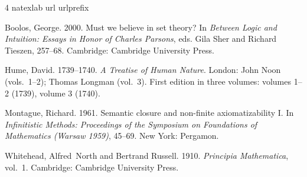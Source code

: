 \documentclass[openany]{memoir}
\begin{document}
\begin{otherlanguage}{english}
\renewcommand{\bibsection}{%
  \begin{otherlanguage}{persian}%
  \chapter*{کتاب‌نامه}%
  \addcontentsline{toc}{chapter}{کتاب‌نامه}%
  \markboth{کتاب‌نامه}{کتاب‌نامه}%
  \end{otherlanguage}%
}
\begin{thebibliography}{4}
\expandafter\ifx\csname natexlab\endcsname\relax\def\natexlab#1{#1}\fi
\expandafter\ifx\csname url\endcsname\relax
  \def\url#1{\texttt{#1}}\fi
\expandafter\ifx\csname urlprefix\endcsname\relax\def\urlprefix{URL }\fi

Boolos, George. 2000.
\newblock Must we believe in set theory?
\newblock In \emph{Between Logic and Intuition: Essays in Honor of {Charles}
  {Parsons}}, eds. Gila {Sher} and Richard {Tieszen}, 257--68. Cambridge:
  Cambridge University Press.

Hume, David. 1739--1740.
\newblock \emph{A Treatise of Human Nature}.
\newblock London: John Noon (vols.~1--2); Thomas Longman (vol.~3).
\newblock First edition in three volumes: volumes 1--2 (1739), volume 3 (1740).

Montague, Richard. 1961.
\newblock Semantic closure and non-finite axiomatizability {I}.
\newblock In \emph{Infinitistic Methods: Proceedings of the Symposium on
  Foundations of Mathematics (Warsaw 1959)}, 45--69. New York: Pergamon.

Whitehead, Alfred~North and Bertrand Russell. 1910.
\newblock \emph{Principia Mathematica}, vol.~1.
\newblock Cambridge: Cambridge University Press.

\end{thebibliography}

\end{otherlanguage}
\endgroup
\end{document}
